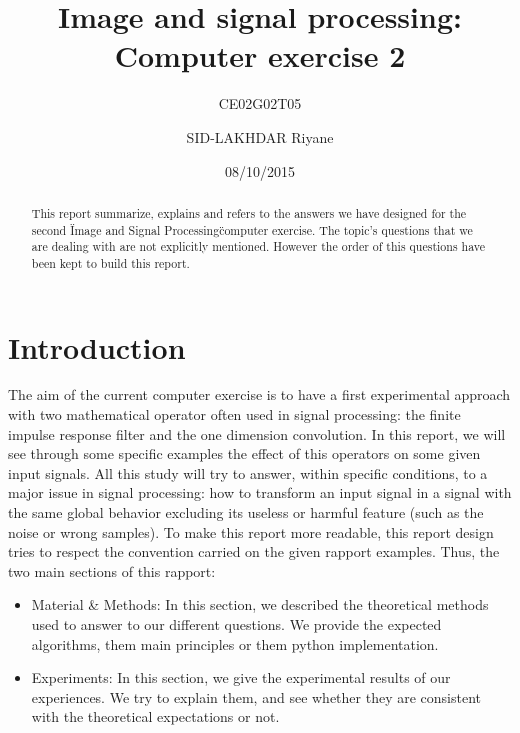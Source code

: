 \documentclass[a4paper,10pt]{article}
\title{Image and signal processing: Computer exercise 2}
\subtitle{CE02G02T05}
\author{SID-LAKHDAR Riyane}
\date{08/10/2015}
\begin{document}


\maketitle


\begin{abstract}
  This report summarize, explains and refers to the answers we have designed for the second \"Image and Signal Processing\" computer exercise.\newline 
  The topic's questions that we are dealing with are not explicitly mentioned.  However the order of this questions have been kept to build this report.
\end{abstract}

\section{Introduction}
The aim of the current computer exercise is to have a first experimental approach with two mathematical operator often used in signal processing: the finite impulse response filter and the one dimension convolution.\newline
In this report, we will see through some specific examples the effect of this operators on some given input signals.   
All this study will try to answer, within specific conditions, to a major issue in signal processing: how to transform an input signal in a signal with the same global behavior excluding its useless or harmful feature (such as the noise or wrong samples).\newline
To make this report more readable, this report design tries to respect the convention carried on the given rapport examples.  Thus, the two main sections of this rapport:
  \begin{itemize}
   \item Material \& Methods: In this section, we described the theoretical methods used to answer to our different questions.  We provide the expected algorithms, them main principles or them python implementation.
   \item Experiments: In this section, we give the experimental results of our experiences.  We try to explain them, and see whether they are consistent with the theoretical expectations or not.
  \end{itemize}
\end{document}
